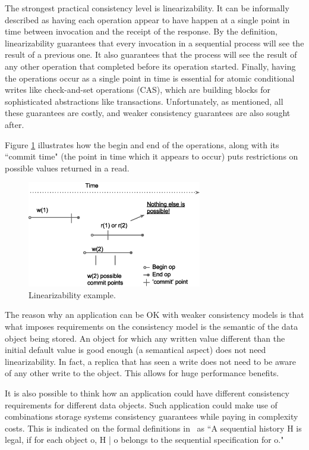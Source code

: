 \documentclass[12pt,conference]{IEEEtran}
\begin{document}
The strongest practical consistency level is linearizability. It can be informally described as having each operation appear to have happen at a single point in time between invocation and the receipt of the response. By the definition, linearizability guarantees that every invocation in a sequential process will see the result of a previous one. It also guarantees that the process will see the result of any other operation that completed before its operation started. Finally, having the operations occur as a single point in time is essential for atomic conditional writes like check-and-set operations (CAS), which are building blocks for sophisticated abstractions like transactions. Unfortunately, as mentioned, all these guarantees are costly, and weaker consistency guarantees are also sought after.

Figure \ref{linearizabilityFigure} illustrates how the begin and end of the operations, along with its ``commit time" (the point in time which it appears to occur) puts restrictions on possible values returned in a read.

\begin{figure}[!t]
\centering
\includegraphics[width=3in]{images/linearizability}
\caption{Linearizability example.}
\label{linearizabilityFigure}
\end{figure}

The reason why an application can be OK with weaker consistency models is that what imposes requirements on the consistency model is the semantic of the data object being stored. An object for which any written value different than the initial default value is good enough (a semantical aspect) does not need linearizability. In fact, a replica that has seen a write does not need to be aware of any other write to the object. This allows for huge performance benefits. 

It is also possible to think how an application could have different consistency requirements for different data objects. Such application could make use of combinations storage systems consistency guarantees while paying in complexity costs. This is indicated on the formal definitions in~\cite{dziuma2013survey} as ``A sequential history H is legal, if for each object o, H | o belongs to the sequential specification for o."
\end{document}
